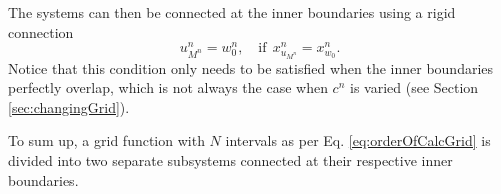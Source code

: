 %
%
The systems can then be connected at the inner boundaries using a rigid connection
\begin{equation}\label{eq:rigid}
    u_{M^n}^n = w_0^n, \quad \text{if}\ \ x_{u_{M^n}}^n = x_{w_0}^n.
\end{equation}
Notice that this condition only needs to be satisfied when the inner boundaries perfectly overlap, which is not always the case when $c^n$ is varied (see Section \ref{sec:changingGrid}).

To sum up, a grid function with $N$ intervals as per Eq. \eqref{eq:orderOfCalcGrid} is divided into two separate subsystems connected at their respective inner boundaries. %



